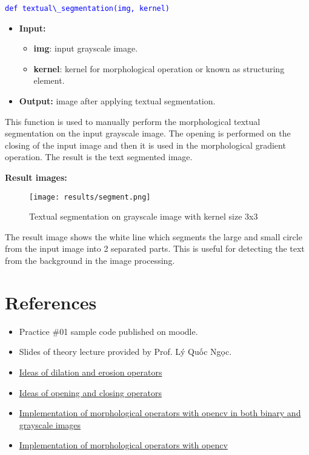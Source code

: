 \documentclass{report}
\begin{document}
\textcolor{blue}{\lstinline|def textual\_segmentation(img, kernel)|}
\begin{itemize}
    \item[] \textbf{Input:}
    \begin{itemize}
        \item \textbf{img}: input grayscale image.
        \item \textbf{kernel}: kernel for morphological operation or known as structuring element.
    \end{itemize}
    \item[] \textbf{Output:} image after applying textual segmentation.
\end{itemize}

This function is used to manually perform the morphological textual segmentation on the input grayscale image. The opening is performed on the closing of the input image and then it is used in the morphological gradient operation. The result is the text segmented image.

\textbf{Result images:}
\begin{figure}[H]
    \centering
    \texttt{[image: results/segment.png]}
    \caption{Textual segmentation on grayscale image with kernel size 3x3}
\end{figure}

The result image shows the white line which segments the large and small circle from the input image into 2 separated parts. This is useful for detecting the text from the background in the image processing.

\pagebreak
\section{References}
\begin{itemize}
  \item[] Practice \#01 sample code published on moodle.
  \item[] Slides of theory lecture provided by Prof. Lý Quốc Ngọc.
  \item[] \href{https://www.mathworks.com/help/images/morphological-dilation-and-erosion.html}{Ideas of dilation and erosion operators}
  \item[] \href{http://users.utcluj.ro/~rdanescu/PI-L7e.pdf}{Ideas of opening and closing operators}
  \item[] \href{https://medium.com/@anshul16/dilation-morphological-operation-image-processing-82d16a619f59}{Implementation of morphological operators with opencv in both binary and grayscale images}
  \item[] \href{https://medium.com/@sasasulakshi/opencv-morphological-dilation-and-erosion-fab65c29efb3}{Implementation of morphological operators with opencv}
\end{itemize}
\end{document}

